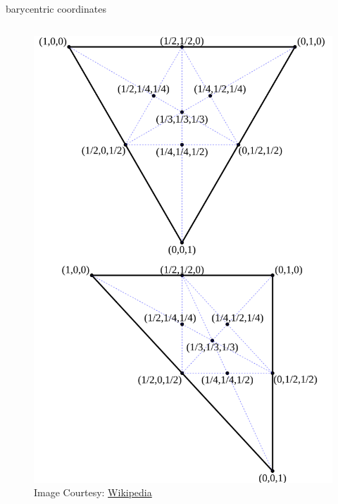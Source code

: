 \documentclass[aspectratio=169,xcolor={dvipsnames,svgnames}]{beamer}
\begin{document}
\begin{frame}[label={sec:orgf0690df}]{barycentric coordinates}
\begin{columns}
\begin{column}{.3\columnwidth}
\begin{figure}[htbp]
\centering
\includegraphics[width=.9\linewidth]{images/TriangleBarycentricCoordinates.svg.png}
\caption{Image Courtesy: \href{https://commons.wikimedia.org/wiki/File:TriangleBarycentricCoordinates.svg}{Wikipedia}}
\end{figure}
\end{column}
\end{columns}
\end{frame}
\end{document}
